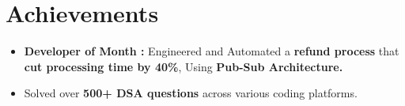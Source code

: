 \documentclass[letterpaper,11pt]{article}
\newcommand{\resumeItem}[1]{
  \item\small{
	{#1 \vspace{-2pt}}
  }
}
\newcommand{\resumeItemListStart}{\begin{itemize}}
\newcommand{\resumeItemListEnd}{\end{itemize}\vspace{-5pt}}
\begin{document}
\vspace{-20pt}
\section{Achievements}
\begin{itemize}[leftmargin=0.0in,label={}]
	\resumeItemListStart
\vspace{-3pt}
        \resumeItem{\textbf{Developer of Month :} Engineered and Automated a \textbf{refund process} that \textbf{cut processing time by 40\%}, Using \textbf{Pub-Sub Architecture.}}
        
    	\resumeItem{Solved over \textbf{500+ DSA questions} across various coding platforms.}
    	
    \resumeItemListEnd
\end{itemize}
\end{document}
